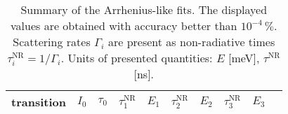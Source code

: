\begin{table}
	\centering
	\caption{Summary of the Arrhenius-like fits. The displayed values are obtained with accuracy better than $10^{-4}\,\%$. Scattering rates $\Gamma_i$ are present as non-radiative times $\tau_i^\mathrm{NR}=1/\Gamma_i$. Units of presented quantities: $E$ [meV], $\tau^\mathrm{NR}$ [ns].}
	\begin{tabularx}{1\textwidth}{cCCCCCCCCC}%
		\toprule
		
		
		
		
		
			transition & $I_0$ & $\tau_0$ & $\tau_1^\mathrm{NR}$ & $E_1$ & $\tau_2^\mathrm{NR}$ & $E_2$ & $\tau_3^\mathrm{NR}$ & $E_3$\\ 	
			\midrule
			\midrule
			

\end{tabularx}
\end{table}
